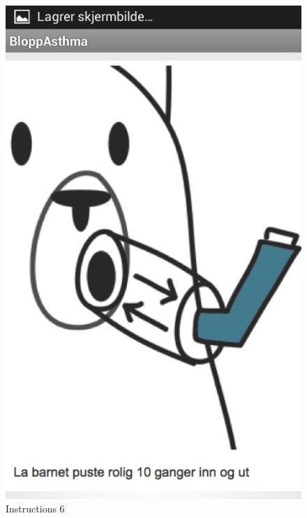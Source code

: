 \begin{figure}
\begin{minipage}[b]{0.3\linewidth}
		\includegraphics[width=0.20\paperwidth]{Pictures/app-screenshots/instructions-6.png}
		\caption{Instructions 6}
		\label{fig:instructions-6}
	\end{minipage}
	

\end{figure}
